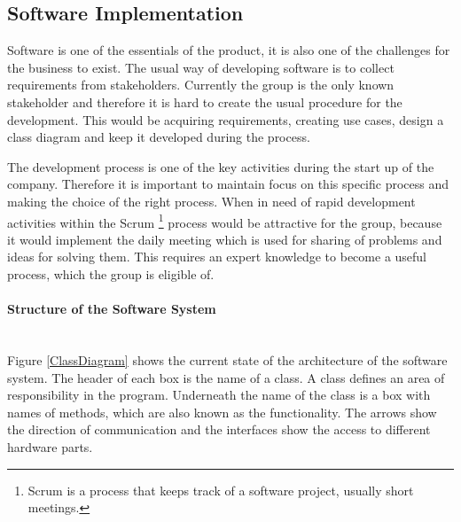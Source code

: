 \subsection{Software Implementation}
Software is one of the essentials of the product, it is also one of the challenges for the business to exist. 
The usual way of developing software is to collect requirements from stakeholders. 
Currently the group is the only known stakeholder and therefore it is hard to create the usual procedure for the development. This would be acquiring requirements, creating use cases, design a class diagram and keep it developed during the process. 

The development process is one of the key activities during the start up of the company. Therefore it is important to maintain focus on this specific process and making the choice of the right process. When in need of rapid development activities within the Scrum \footnote{Scrum is a process that keeps track of a software project, usually short meetings.} process would be attractive for the group, because it would implement the daily meeting which is used for sharing of problems and ideas for solving them. This requires an expert knowledge to become a useful process, which the group is eligible of.

\paragraph*{Structure of the Software System}~\\
Figure \ref{ClassDiagram} shows the current state of the architecture of the software system. The header of each box is the name of a class. A class defines an area of responsibility in the program. 
Underneath the name of the class is a box with 
names of methods, which are also known as the functionality. The arrows show the direction of communication and the interfaces show the access to different hardware parts.

